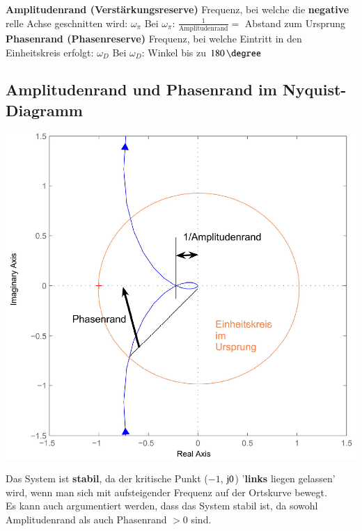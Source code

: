 \begin{outline}
    \1 \textbf{Amplitudenrand (Verstärkungsreserve)}
        \2 Frequenz, bei welche die \textbf{negative} relle Achse geschnitten wird: $\omega_{\pi}$
        \2 Bei $\omega_{\pi}$: $\frac{1}{\text{Amplitudenrand}} =$ Abstand zum Ursprung
    \1 \textbf{Phasenrand (Phasenreserve)}
        \2 Frequenz, bei welche  Eintritt in den Einheitskreis erfolgt: $\omega_D$
        \2 Bei $\omega_D$: Winkel bis zu $180 \, \degree$   %
\end{outline}


\subsection{Amplitudenrand und Phasenrand im Nyquist-Diagramm}

\begin{minipage}[c]{0.5\columnwidth}
    \includegraphics[width=\columnwidth]{images/nyquist_amplitudenrand_phasenrand.png}
\end{minipage}
\hfill
\begin{minipage}[c]{0.45\columnwidth}
    Das System ist \textbf{stabil}, da der kritische Punkt ($-1$, $\mathrm{j} 0$) '\textbf{links} liegen gelassen'
    wird, wenn man sich mit aufsteigender Frequenz auf der Ortskurve bewegt. \\

    Es kann auch argumentiert werden, dass das System stabil ist, da sowohl Amplitudenrand als auch Phasenrand $> 0$ sind.
\end{minipage}
